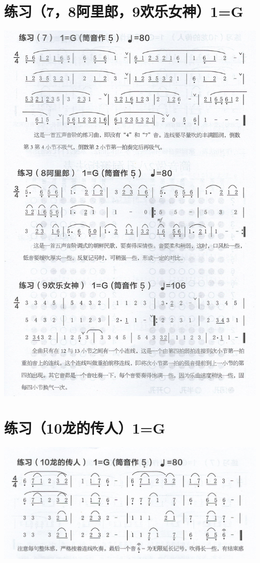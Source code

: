 \documentclass[cn,pad,chinese,chinesefont=nofont]{elegantbook}
\begin{document}
\section{练习（7，8阿里郎，9欢乐女神）1=G}
\includegraphics[height=\textheight]{dongxiao/Scan 3.jpeg}

\section{练习（10龙的传人）1=G}
\includegraphics[width=\textwidth]{dongxiao/Scan 4.jpeg}
\end{document}
